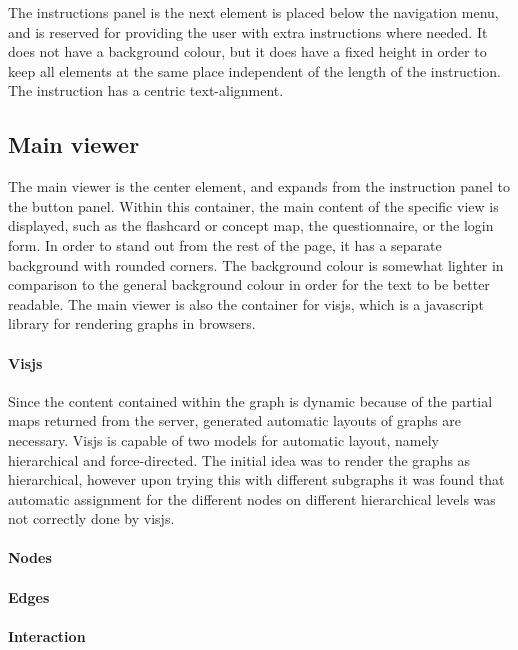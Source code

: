 The instructions panel is the next element is placed below the navigation menu, and is reserved for providing the user with extra instructions where needed. It does not have a background colour, but it does have a fixed height in order to keep all elements at the same place independent of the length of the instruction. The instruction has a centric text-alignment.

\subsection{Main viewer}

The main viewer is the center element, and expands from the instruction panel to the button panel. Within this container, the main content of the specific view is displayed, such as the flashcard or concept map, the questionnaire, or the login form. In order to stand out from the rest of the page, it has a separate background with rounded corners. The background colour is somewhat lighter in comparison to the general background colour in order for the text to be better readable. The main viewer is also the container for visjs, which is a javascript library for rendering graphs in browsers.

\paragraph{Visjs} Since the content contained within the graph is dynamic because of the partial maps returned from the server, generated automatic layouts of graphs are necessary. Visjs is capable of two models for automatic layout, namely hierarchical and force-directed. The initial idea was to render the graphs as hierarchical, however upon trying this with different subgraphs it was found that automatic assignment for the different nodes on different hierarchical levels was not correctly done by visjs. %

\paragraph{Nodes}

\paragraph{Edges}

\paragraph{Interaction}

